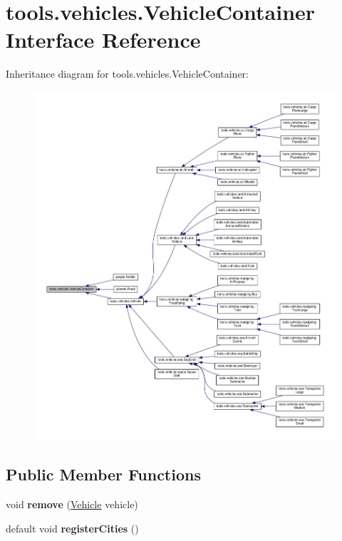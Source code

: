 \hypertarget{interfacetools_1_1vehicles_1_1_vehicle_container}{}\section{tools.\+vehicles.\+Vehicle\+Container Interface Reference}
\label{interfacetools_1_1vehicles_1_1_vehicle_container}


Inheritance diagram for tools.\+vehicles.\+Vehicle\+Container\+:\nopagebreak
\begin{figure}[H]
\begin{center}
\leavevmode
\includegraphics[width=350pt]{interfacetools_1_1vehicles_1_1_vehicle_container__inherit__graph}
\end{center}
\end{figure}
\subsection*{Public Member Functions}
\begin{DoxyCompactItemize}
\item 
void {\bfseries remove} (\hyperlink{classtools_1_1vehicles_1_1_vehicle}{Vehicle} vehicle)\hypertarget{interfacetools_1_1vehicles_1_1_vehicle_container_ad465910a524d4010efb37daa938a518b}{}\label{interfacetools_1_1vehicles_1_1_vehicle_container_ad465910a524d4010efb37daa938a518b}

\item 
default void {\bfseries register\+Cities} ()\hypertarget{interfacetools_1_1vehicles_1_1_vehicle_container_a1faecde28622c73dd6ba5f5dd62187b0}{}\label{interfacetools_1_1vehicles_1_1_vehicle_container_a1faecde28622c73dd6ba5f5dd62187b0}

\end{DoxyCompactItemize}


